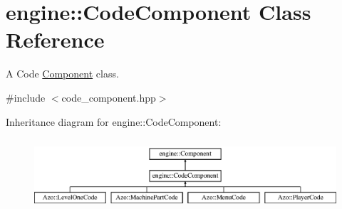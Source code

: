 \hypertarget{classengine_1_1_code_component}{}\section{engine\+:\+:Code\+Component Class Reference}
\label{classengine_1_1_code_component}


A Code \hyperlink{classengine_1_1_component}{Component} class.  




{\ttfamily \#include $<$code\+\_\+component.\+hpp$>$}

Inheritance diagram for engine\+:\+:Code\+Component\+:\begin{figure}[H]
\begin{center}
\leavevmode
\includegraphics[height=2.675159cm]{classengine_1_1_code_component}
\end{center}
\end{figure}
